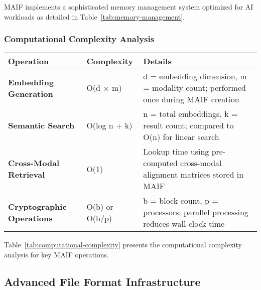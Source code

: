 \documentclass[conference]{IEEEtran}
\begin{document}
MAIF implements a sophisticated memory management system optimized for AI workloads as detailed in Table~\ref{tab:memory-management}.

\subsubsection{Computational Complexity Analysis}

\begin{table*}[!t]
\renewcommand{\arraystretch}{1.3}
\caption{MAIF Computational Complexity Analysis}
\label{tab:computational-complexity}
\centering
\footnotesize
\begin{tabular}{p{3.5cm}p{5cm}p{5.5cm}}
\toprule
\textbf{Operation} & \textbf{Complexity} & \textbf{Details} \\
\midrule
\textbf{Embedding Generation} & O(d × m) & d = embedding dimension, m = modality count; performed once during MAIF creation \\
\textbf{Semantic Search} & O(log n + k) & n = total embeddings, k = result count; compared to O(n) for linear search \\
\textbf{Cross-Modal Retrieval} & O(1) & Lookup time using pre-computed cross-modal alignment matrices stored in MAIF \\
\textbf{Cryptographic Operations} & O(b) or O(b/p) & b = block count, p = processors; parallel processing reduces wall-clock time \\
\bottomrule
\end{tabular}
\end{table*}

Table~\ref{tab:computational-complexity} presents the computational complexity analysis for key MAIF operations.

\subsection{Advanced File Format Infrastructure}
\end{document}
